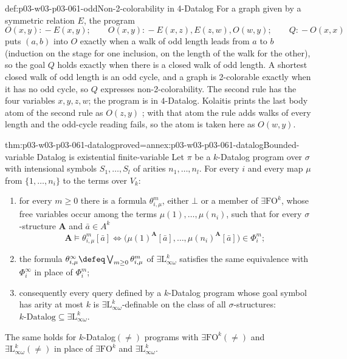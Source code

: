 \begin{hbexample}{def:p03-w03-p03-061-odd}{Non-2-colorability in 4-Datalog}
For a graph given by a symmetric relation \(E\), the program
\[
 O(x,y)\mathrel{{:}\!-} E(x,y);\qquad
 O(x,y)\mathrel{{:}\!-} E(x,z),E(z,w),O(w,y);\qquad
 Q\mathrel{{:}\!-} O(x,x)
\]
puts \((a,b)\) into \(O\) exactly when a walk of odd length leads from
\(a\) to \(b\) (induction on the stage for one inclusion, on the length of
the walk for the other), so the goal \(Q\) holds exactly when there is a
closed walk of odd length. A shortest closed walk of odd length is an odd
cycle, and a graph is 2-colorable exactly when it has no odd cycle, so \(Q\)
expresses non-2-colorability. The second rule has the four variables
\(x,y,z,w\); the program is in \(4\)-Datalog. Kolaitis prints the last body
atom of the second rule as \(O(z,y)\) \cite[p.~70]{Kolaitis2003ExpressivePowerNotes};
with that atom the rule adds walks of every length and the odd-cycle reading
fails, so the atom is taken here as \(O(w,y)\).
\end{hbexample}

\begin{hbtheorem}{thm:p03-w03-p03-061-datalog}{proved=annex:p03-w03-p03-061-datalog}{Bounded-variable Datalog is existential finite-variable}
Let \(\pi\) be a \(k\)-Datalog program over \(\sigma\) with intensional
symbols \(S_1,\ldots,S_l\) of arities \(n_1,\ldots,n_l\). For every \(i\) and
every map \(\mu\) from \(\{1,\ldots,n_i\}\) to the terms over \(V_k\):
\begin{enumerate}
\item for every \(m\ge0\) there is a formula \(\theta^m_{i,\mu}\), either
      \(\bot\) or a member of \(\exists\mathrm{FO}^k\), whose free variables
      occur among the terms \(\mu(1),\ldots,\mu(n_i)\), such that for every
      \(\sigma\)-structure \(\mathbf A\) and \(\bar a\in A^k\)
      \[
       \mathbf A\models\theta^m_{i,\mu}[\bar a]
       \iff
       \bigl(\mu(1)^{\mathbf A}[\bar a],\ldots,\mu(n_i)^{\mathbf A}[\bar a]\bigr)
       \in\Phi^m_i;
      \]
\item the formula \(\theta^\infty_{i,\mu}\defeq\bigvee_{m\ge0}\theta^m_{i,\mu}\)
      of \(\exists\mathrm L^k_{\infty\omega}\) satisfies the same equivalence
      with \(\Phi^\infty_i\) in place of \(\Phi^m_i\);
\item consequently every query defined by a \(k\)-Datalog program whose
      goal symbol has arity at most \(k\) is
      \(\exists\mathrm L^k_{\infty\omega}\)-definable on the class of all
      \(\sigma\)-structures: \(k\text{-Datalog}\subseteq
      \exists\mathrm L^k_{\infty\omega}\).
\end{enumerate}
The same holds for \(k\)-Datalog\((\neq)\) programs with
\(\exists\mathrm{FO}^k(\neq)\) and \(\exists\mathrm L^k_{\infty\omega}(\neq)\)
in place of \(\exists\mathrm{FO}^k\) and \(\exists\mathrm L^k_{\infty\omega}\).
\end{hbtheorem}

